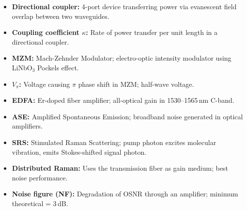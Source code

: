 \documentclass[12pt,a4paper]{article}
\begin{document}
\begin{tcolorbox}[defbox, title={\textbf{One-Line Definitions}}]
\begin{itemize}[leftmargin=*, itemsep=2pt, topsep=0pt]
  \item \textbf{Directional coupler:} 4-port device transferring power via evanescent field overlap between two waveguides.
  \item \textbf{Coupling coefficient $\kappa$:} Rate of power transfer per unit length in a directional coupler.
  \item \textbf{MZM:} Mach-Zehnder Modulator; electro-optic intensity modulator using LiNbO$_3$ Pockels effect.
  \item \textbf{$V_\pi$:} Voltage causing $\pi$ phase shift in MZM; half-wave voltage.
  \item \textbf{EDFA:} Er-doped fiber amplifier; all-optical gain in 1530--1565\,nm C-band.
  \item \textbf{ASE:} Amplified Spontaneous Emission; broadband noise generated in optical amplifiers.
  \item \textbf{SRS:} Stimulated Raman Scattering; pump photon excites molecular vibration, emits Stokes-shifted signal photon.
  \item \textbf{Distributed Raman:} Uses the transmission fiber as gain medium; best noise performance.
  \item \textbf{Noise figure (NF):} Degradation of OSNR through an amplifier; minimum theoretical = 3\,dB.
\end{itemize}
\end{tcolorbox}
\end{document}
